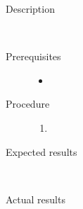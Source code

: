 \begin{description}
	\item[Description] \hfill \\
		
	\item[Prerequisites] \hfill
		\begin{itemize}
			\item{}
		\end{itemize}
	\item[Procedure] \hfill
		\begin{enumerate}
			\item{}
		\end{enumerate}
	\item[Expected results] \hfill \\
		
	\item[Actual results] \hfill \\

\end{description}